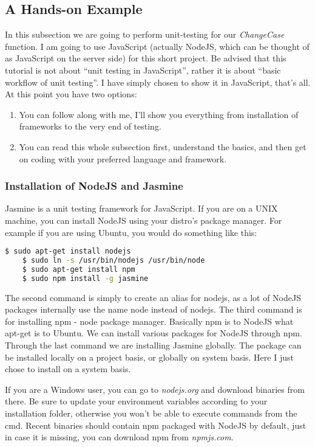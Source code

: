 \documentclass{article}
\begin{document}
\subsection{A Hands-on Example}
In this subsection we are going to perform unit-testing for our \textit{ChangeCase} function.
I am going to use JavaScript (actually NodeJS, which can be thought of as JavaScript on the server side) 
for this short project. Be advised that this tutorial is not about ``unit testing in JavaScript'', rather it is about
``basic workflow of unit testing''. I have simply chosen to show it in JavaScript, that's all.
At this point you have two options:
\begin{enumerate}
	\item You can follow along with me, I'll show you everything from installation of frameworks to the very end of testing.
	\item You can read this whole subsection first, understand the basics, 
	and then get on coding with your preferred language and framework.
\end{enumerate}

\subsubsection{Installation of NodeJS and Jasmine}
Jasmine is a unit testing framework for JavaScript.
If you are on a UNIX machine, you can install NodeJS using your distro's package manager.
For example if you are using Ubuntu, you would do something like this:
\begin{lstlisting}[language=bash]
	$ sudo apt-get install nodejs
	$ sudo ln -s /usr/bin/nodejs /usr/bin/node
	$ sudo apt-get install npm
	$ sudo npm install -g jasmine
\end{lstlisting}
The second command is simply to create an alias for nodejs, 
as a lot of NodeJS packages internally use the name node instead of nodejs.
The third command is for installing npm - node package manager. Basically npm is to NodeJS what apt-get is to Ubuntu.
We can install various packages for NodeJS through npm.
Through the last command we are installing Jasmine globally.
The package can be installed locally on a project basis, or globally on system basis.
Here I just chose to install on a system basis.

If you are a Windows user, you can go to \textit{nodejs.org} and download binaries from there.
Be sure to update your environment variables according to your installation folder, 
otherwise you won't be able to execute commands from the cmd.
Recent binaries should contain npm packaged with NodeJS by default, just in case it is missing, you can download
npm from \textit{npmjs.com}.
\end{document}
